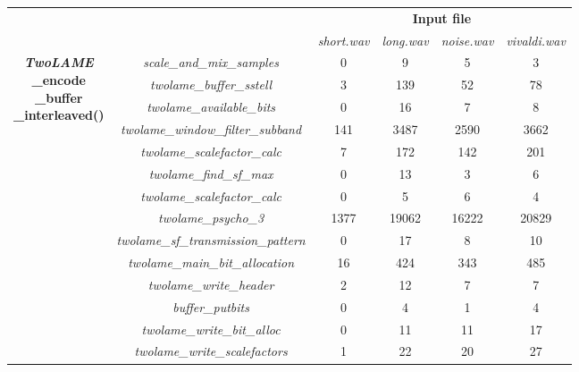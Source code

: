 \begin{table}[H]
    \centering
    \begin{tabular}{|c|c|c|c|c|c|}
    \cline{3-6}
    \multicolumn{2}{c|}{}  & \multicolumn{4}{c|}{\textbf{Input file}} \\
    \cline{3-6}
    \multicolumn{2}{c|}{} & \textit{short.wav} & \textit{long.wav} & \textit{noise.wav} & \textit{vivaldi.wav} \\
    \cline{1-6}
   \multirow{23}{*}{\parbox{2.5cm}{\centering \textbf{\textit{TwoLAME}} \\ \textbf{\_encode} \\ \textbf{\_buffer} \\ \textbf{\_interleaved()}}}  & \multicolumn{1}{c|}{\textit{scale\_and\_mix\_samples}}  & 0 & 9 & 5 & 3 \\ 
    \cline{2-6}
    & \multicolumn{1}{c|}{\textit{twolame\_buffer\_sstell}} & 3 & 139 & 52 & 78 \\ 
    \cline{2-6}
    & \multicolumn{1}{c|}{\textit{twolame\_available\_bits}} & 0 & 16 & 7 & 8  \\ 
    \cline{2-6}
    & \multicolumn{1}{c|}{\textit{twolame\_window\_filter\_subband}} & 141  & 3487 & 2590 & 3662  \\ 
    \cline{2-6}
    & \multicolumn{1}{c|}{\textit{twolame\_scalefactor\_calc}} & 7 & 172 & 142 &  201  \\ 
    \cline{2-6}
    & \multicolumn{1}{c|}{\textit{twolame\_find\_sf\_max}} & 0  & 13 & 3 & 6   \\ 
    \cline{2-6}
    & \multicolumn{1}{c|}{\textit{twolame\_scalefactor\_calc}} & 0  & 5 & 6 & 4  \\ 
    \cline{2-6}
     & \multicolumn{1}{c|}{\textit{twolame\_psycho\_3}} & 1377  & 19062 & 16222 &  20829 \\ 
    \cline{2-6}
    & \multicolumn{1}{c|}{\textit{twolame\_sf\_transmission\_pattern}} & 0 & 17 & 8 &  10 \\ 
    \cline{2-6}
    & \multicolumn{1}{c|}{\textit{twolame\_main\_bit\_allocation}} & 16  & 424 & 343 & 485  \\ 
    \cline{2-6}
    & \multicolumn{1}{c|}{\textit{twolame\_write\_header}} & 2 & 12 & 7 &  7 \\
    \cline{2-6}
    & \multicolumn{1}{c|}{\textit{buffer\_putbits}} & 0 & 4 & 1 & 4  \\
    \cline{2-6}
    & \multicolumn{1}{c|}{\textit{twolame\_write\_bit\_alloc}} & 0 & 11 & 11 &  17 \\
    \cline{2-6}
    & \multicolumn{1}{c|}{\textit{twolame\_write\_scalefactors}} & 1 & 22 & 20 & 27 \\

\end{tabular}
\end{table}
